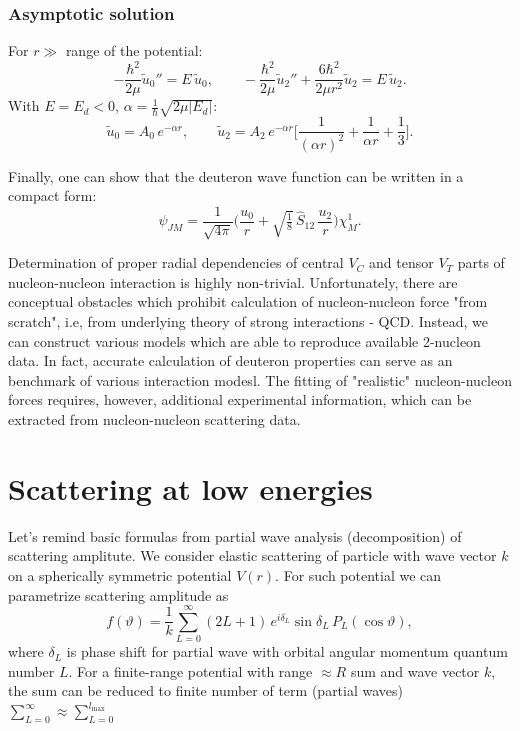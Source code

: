 \documentclass[11pt,a4paper]{article}
\newcommand{\op}[1]{\hat{#1}}
\begin{document}
\subsubsection*{Asymptotic solution}

For $r\gg$ range of the potential:
\[
-\frac{\hbar^2}{2\mu}\tilde u_0''=E\,\tilde u_0,\qquad
-\frac{\hbar^2}{2\mu}\tilde u_2''+\frac{6\hbar^2}{2\mu r^2}\tilde u_2=E\,\tilde u_2 .
\]
With $E=E_d<0$, $\alpha=\frac1\hbar\sqrt{2\mu|E_d|}$:
\[
\tilde u_0=A_0\,e^{-\alpha r},\qquad
\tilde u_2=A_2\,e^{-\alpha r}\Big[\frac{1}{(\alpha r)^2}+\frac{1}{\alpha r}+\frac13\Big].
\]

Finally, one can show that the deuteron wave function can be written in a
compact form:
\[
\psi_{JM}=\frac{1}{\sqrt{4\pi}}\Big(\frac{u_0}{r}+\sqrt{\tfrac18}\,\op S_{12}\,\frac{u_2}{r}\Big)\chi^1_M .
\]

Determination of proper radial dependencies of central $V_C$ and tensor $V_T$ parts of nucleon-nucleon interaction is highly non-trivial. Unfortunately, there are conceptual obstacles which prohibit calculation of nucleon-nucleon force "from scratch", i.e, from underlying theory of strong interactions - QCD. Instead, we can construct various models which are able to reproduce available 2-nucleon data. In fact, accurate calculation of deuteron properties can serve as an benchmark of various interaction modesl. The fitting of "realistic" nucleon-nucleon forces requires, however, additional experimental information, which can be extracted from nucleon-nucleon scattering data. 

\section{Scattering at low energies}
Let's remind basic formulas from partial wave analysis (decomposition) of scattering amplitute. We consider elastic scattering of particle with wave vector $k$ on a spherically symmetric potential $V(r)$. For such potential we can parametrize scattering amplitude as 
\[
f(\vartheta)=\frac1k\sum_{L=0}^{\infty}(2L+1)\,e^{i\delta_L}\sin\delta_L\,P_L(\cos\vartheta),
\]
where $\delta_L$ is phase shift for partial wave with orbital angular momentum quantum number $L$. 
For a finite-range potential with range $\approx R$ sum and wave vector $k$, the sum can be reduced to finite number of term (partial waves) $\displaystyle\sum_{L=0}^{\infty}\approx\sum_{L=0}^{l_{\max}}$
\end{document}
